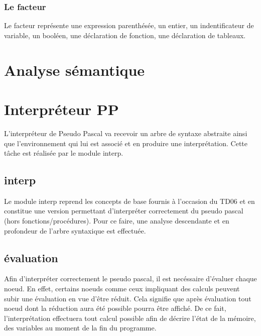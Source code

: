 \documentclass[11pt,a4paper]{article}
\begin{document}
\subsubsection{Le facteur}
Le facteur représente une expression parenthésée, un entier, un indentificateur de variable, un booléen, une déclaration de fonction, une déclaration de tableaux.


\section{Analyse sémantique}



\section{Interpréteur PP}
L'interpréteur de Pseudo Pascal va recevoir un arbre de syntaxe abstraite ainsi que l'environnement qui lui est associé et en produire une interprétation.
Cette tâche est réalisée par le module interp.
\subsection{interp}
Le module interp reprend les concepts de base fournis à l'occasion du TD06 et en constitue une version permettant d'interpréter correctement du pseudo pascal (hors fonctions/procédures).
Pour ce faire, une analyse descendante et en profondeur de l'arbre syntaxique est effectuée.
\subsection{évaluation}
Afin d'interpréter correctement le pseudo pascal, il est necéssaire d'évaluer chaque noeud.
En effet, certains noeuds comme ceux impliquant des calculs peuvent subir une évaluation en vue d'être réduit.
Cela signifie que après évaluation tout noeud dont la réduction aura été possible pourra être affiché.
De ce fait, l'interprétation effectuera tout calcul possible afin de décrire l'état de la mémoire, des variables au moment de la fin du programme.
\end{document}
